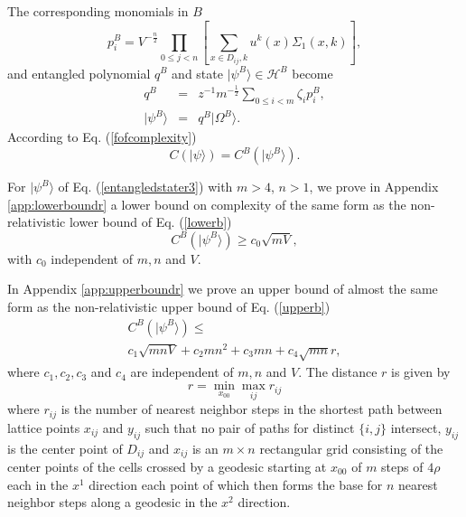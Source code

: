 \documentclass[12pt,amsmath,amssymb,onecolumn]{revtex4-2}
\begin{document}
The corresponding monomials in $B$ 
\begin{equation}
\label{pstatesrb}
p^B_i = 
V^{-\frac{n}{2}}\prod_{0 \le j <n} \left[\sum_{x \in D_{ij}, k} u^k(x) \Sigma_1( x,k )\right],
\end{equation}
and entangled polynomial $q^B$ and state $|\psi^B \rangle  \in \mathcal{H}^B$ become
\begin{subequations}
\begin{eqnarray}
\label{entangledstater2}
q^B &=& z^{-1} m^{-\frac{1}{2}}\sum_{0 \le i < m} \zeta_i p^B_i, \\ 
\label{entangledstater3}
|\psi^B \rangle   &=&  q^B|\Omega^B \rangle .
\end{eqnarray}
\end{subequations}
According to Eq. (\ref{fofcomplexity})
\begin{equation}
  \label{cofrelpsi}
  C( |\psi \rangle ) = C^B( |\psi^B \rangle ).
\end{equation}

For $|\psi^B \rangle $ of Eq. (\ref{entangledstater3})
with $m > 4$, $n > 1$,
we prove in Appendix \ref{app:lowerboundr} a lower bound on complexity
of the same form as the non-relativistic lower bound of Eq. (\ref{lowerb})
\begin{equation}
\label{lowerbr}
C^B( |\psi^B \rangle ) \geq c_0 \sqrt{ m V},
\end{equation}
with $c_0$ independent of $m, n$ and $V$.

In Appendix \ref{app:upperboundr} we prove an
upper bound of almost the same form as the non-relativistic upper bound of Eq. (\ref{upperb})
\begin{multline}
\label{upperbr}
C^B( |\psi^B \rangle ) \leq \\ c_1 \sqrt{m n V} + c_2 m n^2 + c_3 m n + c_4\sqrt{mn} r,
\end{multline}
where $c_1, c_2, c_3$ and $c_4$ are independent of $m, n$ and $V$.
The distance $r$ is given by
\begin{equation}
  \label{defsbar1}
  r = \min_{x_{00}} \max_{ij} r_{ij}
\end{equation}
where $r_{ij}$ is the number of nearest
neighbor steps in the
shortest path between
lattice points $x_{ij}$ and $y_{ij}$
such that no pair of paths for distinct
$\{i, j\}$ intersect,
$y_{ij}$ is the center point of $D_{ij}$
and $x_{ij}$ is an $m \times n$ rectangular grid
consisting of the center points of
the cells crossed by a geodesic starting at $x_{00}$ of $m$ steps of
$4 \rho$ each in the $x^1$ direction each
point of which then forms the base for 
$n$ nearest neighbor steps along a geodesic in
the $x^2$ direction.
\end{document}
